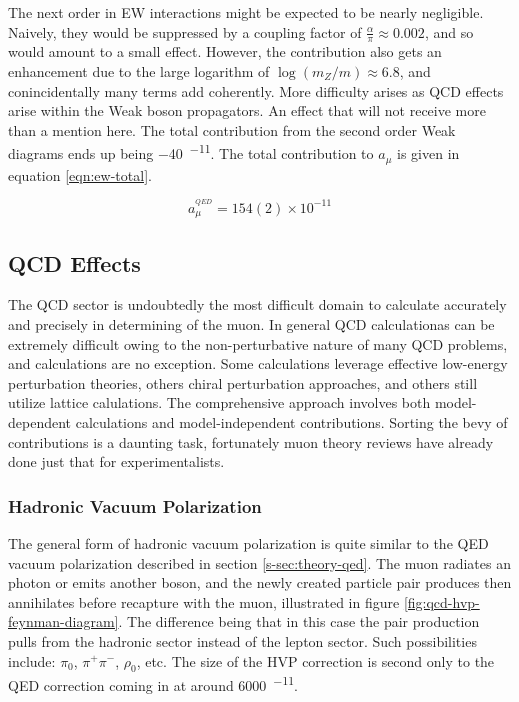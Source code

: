 The next order in EW interactions might be expected to be nearly negligible.  Naively, they would be suppressed by a coupling factor of $\frac{\alpha}{\pi} \approx 0.002$, and so would amount to a small effect.  However, the contribution also gets an enhancement due to the large logarithm of $\log(m_Z/m) \approx 6.8$, and conincidentally many terms add coherently.  More difficulty arises as QCD effects arise within the Weak boson propagators.  An effect that will not receive more than a mention here.  The total contribution from the second order Weak diagrams ends up being \SI{-40}{^{-11}}\cite{the-muon-g-2}.  The total contribution to $a_\mu$ is given in equation \ref{eqn:ew-total}. 

\begin{equation}
\label{eqn:ew-total}
a_\mu^{^{QED}} = 154(2) \times 10^{-11}
\end{equation}

\subsection{QCD Effects} \label{s-sec:theory-qcd}

The QCD sector is undoubtedly the most difficult domain to calculate accurately and precisely in determining \gmtwo of the muon.  In general QCD calculationas can be extremely difficult owing to the non-perturbative nature of many QCD problems, and \mugmtwo calculations are no exception.  Some calculations leverage effective low-energy perturbation theories, others chiral perturbation approaches, and others still utilize lattice calulations\cite{the-muon-g-2}.  The comprehensive approach involves both model-dependent calculations and model-independent contributions.  Sorting the bevy of contributions is a daunting task, fortunately muon \gmtwo theory reviews have already done just that for experimentalists.

\subsubsection{Hadronic Vacuum Polarization}

The general form of hadronic vacuum polarization is quite similar to the QED vacuum polarization described in section \ref{s-sec:theory-qed}.  The muon radiates an photon or emits another boson, and the newly created particle pair produces then annihilates before recapture with the muon, illustrated in figure \ref{fig:qcd-hvp-feynman-diagram}.  The difference being that in this case the pair production pulls from the hadronic sector instead of the lepton sector.  Such possibilities include: $\pi_0$, $\pi^+\pi^-$, $\rho_0$, etc.  The size of the HVP correction is second only to the QED correction coming in at around \SI{6000}{^{-11}}.  

